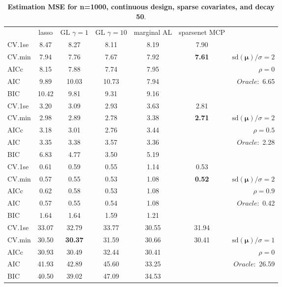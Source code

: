 \clearpage
\begin{table}\vspace{-.5cm}
\caption[l]{ { \bf Estimation MSE for n=1000, continuous design, 
sparse covariates, and  decay  50}.}
\vspace{-.5cm}
\footnotesize{}
\begin{center}
\begin{tabular}{l*{5}{c}|r}
& lasso & GL $\gamma=1$ & GL $\gamma=10$ & marginal AL & sparsenet MCP  & \\
 \cline{1-7}
CV.1se & 8.47 & 8.27 & 8.11 & 8.19 & 7.90 & \\
CV.min & 7.94 & 7.76 & 7.67 & 7.92 & {\bf 7.61} &  $\mathrm{sd}(\mathbf{\mu})/\sigma=2$ \\
AICc & 8.15 & 7.88 & 7.74 & 7.95 & & $\rho=0$ \\
AIC & 9.89 & 10.03 & 10.73 & 7.94 & &  \multirow{2}{*}{$Oracle: $ 6.65} \\
BIC & 10.42 & 9.81 & 9.31 & 9.16 & &  \\
 \hline 
CV.1se & 3.20 & 3.09 & 2.93 & 3.63 & 2.81 & \\
CV.min & 2.98 & 2.89 & 2.78 & 3.38 & {\bf 2.71} &  $\mathrm{sd}(\mathbf{\mu})/\sigma=2$ \\
AICc & 3.18 & 3.01 & 2.76 & 3.44 & & $\rho=0.5$ \\
AIC & 3.35 & 3.38 & 3.57 & 3.36 & &  \multirow{2}{*}{$Oracle: $ 2.28} \\
BIC & 6.83 & 4.77 & 3.50 & 5.19 & &  \\
 \hline 
CV.1se & 0.61 & 0.59 & 0.55 & 1.14 & 0.53 & \\
CV.min & 0.57 & 0.55 & 0.53 & 1.08 & {\bf 0.52} &  $\mathrm{sd}(\mathbf{\mu})/\sigma=2$ \\
AICc & 0.62 & 0.58 & 0.53 & 1.08 & & $\rho=0.9$ \\
AIC & 0.57 & 0.55 & 0.54 & 1.08 & &  \multirow{2}{*}{$Oracle: $ 0.42} \\
BIC & 1.64 & 1.64 & 1.59 & 1.21 & &  \\
 \hline 
CV.1se & 33.07 & 32.79 & 33.77 & 30.55 & 31.94 & \\
CV.min & 30.50 & {\bf 30.37} & 31.59 & 30.66 & 30.41 &  $\mathrm{sd}(\mathbf{\mu})/\sigma=1$ \\
AICc & 30.93 & 30.49 & 32.44 & 30.41 & & $\rho=0$ \\
AIC & 41.93 & 42.89 & 45.60 & 33.25 & &  \multirow{2}{*}{$Oracle: $ 26.59} \\
BIC & 40.50 & 39.02 & 47.09 & 34.53 & &  \\

\end{tabular}
\end{center}
\end{table}
